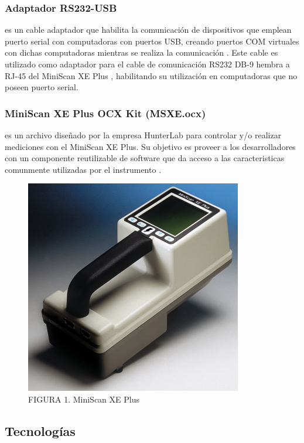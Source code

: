 \documentclass[conference]{IEEEtran}
\begin{document}
		\subsubsection{Adaptador RS232-USB}
			es un cable adaptador que habilita la comunicaci\'{o}n de dispositivos que emplean puerto serial con computadoras con puertos USB, creando puertos COM virtuales con dichas computadoras mientras se realiza la comunicaci\'{o}n \cite{RS232}. Este cable es utilizado como adaptador para el cable de comunicaci\'{o}n RS232 DB-9 hembra a \mbox{RJ-45} del MiniScan XE Plus \cite{HunterLab-manual}, habilitando su utilizaci\'{o}n en computadoras que no poseen puerto serial.
		
		\subsubsection{MiniScan XE Plus OCX Kit (MSXE.ocx)}
			es un archivo dise\~{n}ado por la empresa HunterLab para controlar y/o realizar mediciones con el MiniScan XE Plus. Su objetivo es proveer a los desarrolladores con un componente reutilizable de software que da acceso a las caracteristicas comunmente utilizadas por el instrumento \cite{MiniScanXEPlus-manual}.
			
		\begin{figure}[H]
			\centering
			\label{figura_1}
			\includegraphics[scale=0.9]{img/MiniScanXEPlus}
			\caption{FIGURA 1. MiniScan XE Plus}
		\end{figure}		
	
	\subsection{Tecnolog\'{i}as}
\end{document}
